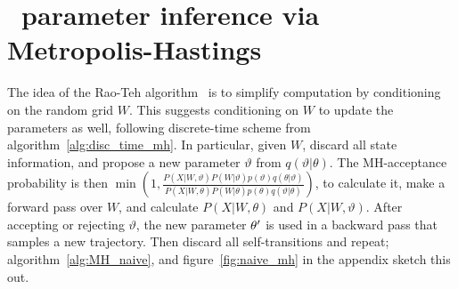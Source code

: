 \vspace{-.1in}
\section{\Naive\ parameter inference via Metropolis-Hastings}
The idea of the Rao-Teh algorithm~\cite{RaoTeh13} is to simplify
computation by conditioning on the
random grid $W$.
This suggests conditioning on $W$ to update
the parameters as well, following discrete-time scheme from
algorithm~\ref{alg:disc_time_mh}.
In particular, given $W$, discard all state information, and propose a 
new parameter $\vartheta$ from $q(\vartheta|\theta)$. 
The MH-acceptance probability is then $\min\left(1,
\frac{P(X|W,\vartheta)P(W|\vartheta)p(\vartheta)q(\theta|\vartheta)}
     {P(X|W,\theta)P(W|\theta)p(\theta)q(\vartheta|\theta)}\right)$, 
     to calculate it,
make a forward pass over $W$, and calculate 
$P(X|W,\theta)$ and $P(X|W,\vartheta)$. %
After accepting or rejecting $\vartheta$, the new parameter $\theta'$ is used in
a backward pass that samples a new trajectory. Then discard all 
self-transitions and repeat; algorithm~\ref{alg:MH_naive}, and 
figure~\ref{fig:naive_mh} in the appendix sketch this out.

